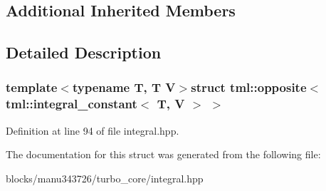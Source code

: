 \subsection*{Additional Inherited Members}


\subsection{Detailed Description}
\subsubsection*{template$<$typename T, T V$>$struct tml\+::opposite$<$ tml\+::integral\+\_\+constant$<$ T, V $>$ $>$}



Definition at line 94 of file integral.\+hpp.



The documentation for this struct was generated from the following file\+:\begin{DoxyCompactItemize}
\item 
blocks/manu343726/turbo\+\_\+core/integral.\+hpp\end{DoxyCompactItemize}
